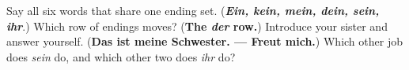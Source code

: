\begin{tcolorbox}[breakable,colback=teal!4,colframe=teal!35!black,title={Before you move on}]
Say all six words that share one ending set. (\emph{\textbf{Ein, kein, mein, dein, sein, ihr}}.) Which row of endings moves? (\textbf{The \emph{der} row.}) Introduce your sister and answer yourself. (\textbf{Das ist meine Schwester. — Freut mich.}) Which other job does \emph{sein} do, and which other two does \emph{ihr} do?
\end{tcolorbox}
